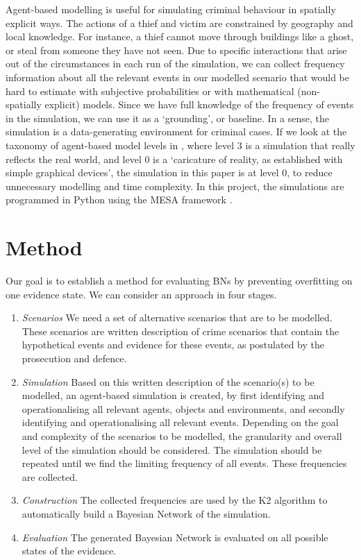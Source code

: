 \documentclass[12pt]{article}
\begin{document}
Agent-based modelling is useful for simulating criminal behaviour in spatially explicit ways. The actions of a thief and victim are constrained by geography and local knowledge. For instance, a thief cannot move through buildings like a ghost, or steal from someone they have not seen. Due to specific interactions that arise out of the circumstances in each run of the simulation, we can collect frequency information about all the relevant events in our modelled scenario that would be hard to estimate with subjective probabilities or with mathematical (non-spatially explicit) models. Since we have full knowledge of the frequency of events in the simulation, we can use it as a `grounding', or baseline. In a sense, the simulation is a data-generating environment for criminal cases. If we look at the taxonomy of agent-based model levels in \citep{gilbert2005}, where level 3 is a simulation that really reflects the real world, and level 0 is a `caricature of reality, as established with simple graphical devices', the simulation in this paper is at level 0, to reduce unnecessary modelling and time complexity. In this project, the simulations are programmed in Python using the MESA framework  \citep{mesa2020}.

\newpage

\section{Method}

Our goal is to establish a method for evaluating BNs by preventing overfitting on one evidence state. We can consider an approach in four stages.

\begin{enumerate}
\item \emph{Scenarios} We need a set of alternative scenarios that are to be modelled. These scenarios are written description of crime scenarios that contain the hypothetical events and evidence for these events, as postulated by the prosecution and defence. 

\item  \emph{Simulation} Based on this written description of the scenario(s) to be modelled, an agent-based simulation is created, by first identifying and operationalising all relevant agents, objects and environments, and secondly identifying and operationalising all relevant events. Depending on the goal and complexity of the scenarios to be modelled, the granularity and overall level of the simulation should be considered. The simulation should be repeated until we find the limiting frequency of all events. These frequencies are collected.

\item  \emph{Construction} The collected frequencies are used by the K2 algorithm to automatically build a Bayesian Network of the simulation. 

\item  \emph{Evaluation} The generated Bayesian Network is evaluated on all possible states of the evidence.

\end{enumerate}
\end{document}
